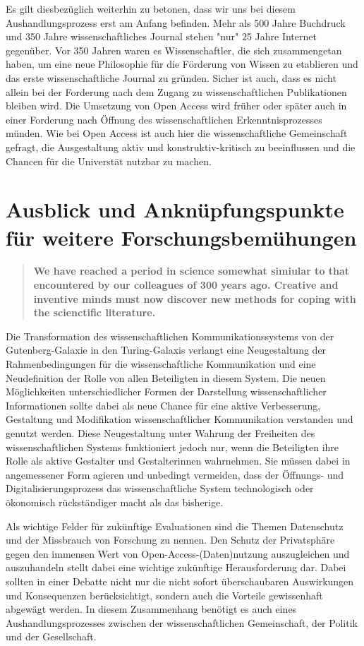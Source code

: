 Es gilt diesbezüglich weiterhin zu betonen, dass wir uns bei diesem Aushandlungsprozess erst am Anfang befinden. Mehr als 500 Jahre Buchdruck und 350 Jahre wissenschaftliches Journal stehen "nur" 25 Jahre Internet gegenüber. Vor 350 Jahren waren es Wissenschaftler, die sich zusammengetan haben, um eine neue Philosophie für die Förderung von Wissen zu etablieren und das erste wissenschaftliche Journal zu gründen. Sicher ist auch, dass es nicht allein bei der Forderung nach dem Zugang zu wissenschaftlichen Publikationen bleiben wird. Die Umsetzung von Open Access wird früher oder später auch in einer Forderung nach Öffnung des wissenschaftlichen Erkenntnisprozesses münden. Wie bei Open Access ist auch hier die wissenschaftliche Gemeinschaft gefragt, die Ausgestaltung aktiv und konstruktiv-kritisch zu beeinflussen und die Chancen für die Universtät nutzbar zu machen.

\section{Ausblick und Anknüpfungspunkte für weitere Forschungsbemühungen}

\begin{quote}
\textbf{We have reached a period in science somewhat simiular to that encountered by our colleagues of 300 years ago. Creative and inventive minds must now discover new methods for coping with the scienctific literature.}
\end{quote} \cite{porter_1964_scientific}

Die Transformation des wissenschaftlichen Kommunikationssystems von der Gutenberg-Galaxie in den Turing-Galaxis verlangt eine Neugestaltung der Rahmenbedingungen für die wissenschaftliche Kommunikation und eine Neudefinition der Rolle von allen Beteiligten in diesem System. Die neuen Möglichkeiten unterschiedlicher Formen der Darstellung wissenschaftlicher Informationen sollte dabei als neue Chance für eine aktive Verbesserung, Gestaltung und Modifikation wissenschaftlicher Kommunikation verstanden und genutzt werden. Diese Neugestaltung unter Wahrung der Freiheiten des wissenschaftlichen Systems funktioniert jedoch nur, wenn die Beteiligten ihre Rolle als aktive Gestalter und Gestalterinnen wahrnehmen. Sie müssen dabei in angemessener Form agieren und unbedingt vermeiden, dass der Öffnungs- und Digitalisierungsprozess das wissenschaftliche System technologisch oder ökonomisch rückständiger macht als das bisherige.

Als wichtige Felder für zukünftige Evaluationen sind die Themen Datenschutz und der Missbrauch von Forschung \cite{Fritsch_2015} zu nennen. Den Schutz der Privatsphäre gegen den immensen Wert von Open-Access-(Daten)nutzung auszugleichen und auszuhandeln stellt dabei eine wichtige zukünftige Herausforderung dar. Dabei sollten in einer Debatte nicht nur die nicht sofort überschaubaren Auswirkungen und Konsequenzen berücksichtigt, sondern auch die Vorteile gewissenhaft abgewägt werden. In diesem Zusammenhang benötigt es auch eines Aushandlungsprozesses zwischen der wissenschaftlichen Gemeinschaft, der Politik und der Gesellschaft.

